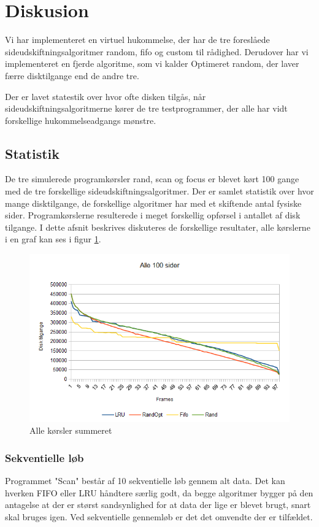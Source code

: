 \section{Diskusion}
\label{sec:diskusion}
Vi har implementeret en virtuel hukommelse, der har de tre foreslåede sideudskiftningsalgoritmer random, fifo og custom til rådighed. Derudover har vi implementeret en fjerde algoritme, som vi kalder Optimeret random, der laver færre disktilgange end de andre tre.

Der er lavet statestik over hvor ofte disken tilgås, når sideudskiftningsalgoritmerne kører de tre testprogrammer, der alle har vidt forskellige hukommelseadgangs mønstre. 

\subsection{Statistik}
\label{subsec:statistik}
De tre simulerede programkørsler rand, scan og focus er blevet kørt 100 gange med de tre forskellige sideudskiftningsalgoritmer. Der er samlet statistik over hvor mange disktilgange, de forskellige algoritmer har med et skiftende antal fysiske sider. Programkørslerne resulterede i meget forskellig opførsel i antallet af disk tilgange. I dette afsnit beskrives diskuteres de forskellige resultater, alle kørslerne i en graf kan ses i figur \ref{fig:all}.

\begin{figure}[ht]
\centerline{\includegraphics[scale=1]{graph/stat_all}}
\FloatBarrier
\caption{Alle kørsler summeret}
\label{fig:all}
\end{figure}

\subsubsection{Sekventielle løb}
Programmet "Scan" består af 10 sekventielle løb gennem alt data. Det kan hverken FIFO eller LRU håndtere særlig godt, da begge algoritmer bygger på den antagelse at der er størst sandsynlighed for at data der lige er blevet brugt, snart skal bruges igen. Ved sekventielle gennemløb er det det omvendte der er tilfældet. 

